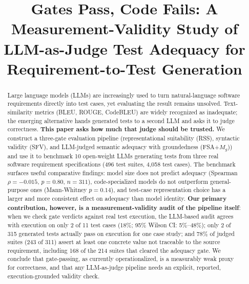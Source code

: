 \documentclass[conference]{IEEEtran}
\begin{document}
  \title{Gates Pass, Code Fails: A Measurement-Validity Study of LLM-as-Judge Test Adequacy for Requirement-to-Test Generation}

  \author{
  }

  \maketitle

  \begin{abstract}
  Large language models (LLMs) are increasingly used to turn natural-language software requirements directly into test cases, yet evaluating the result remains unsolved. Text-similarity metrics (BLEU, ROUGE, CodeBLEU) are widely recognized as inadequate; the emerging alternative hands generated tests to a second LLM and asks it to judge correctness. \textbf{This paper asks how much that judge should be trusted.} We construct a three-gate evaluation pipeline (representational suitability (RSS), syntactic validity (SFV), and LLM-judged semantic adequacy with groundedness (FSA+$M_g$)) and use it to benchmark 10 open-weight LLMs generating tests from three real software requirement specifications (496 test suites, 4{,}058 test cases). The benchmark surfaces useful comparative findings: model size does not predict adequacy (Spearman $\rho=-0.015$, $p=0.80$, $n=311$), code-specialized models do not outperform general-purpose ones (Mann-Whitney $p=0.14$), and test-case representation choice has a larger and more consistent effect on adequacy than model identity. \textbf{Our primary contribution, however, is a measurement-validity audit of the pipeline itself}: when we check gate verdicts against real test execution, the LLM-based audit agrees with execution on only 2 of 11 test cases (18\%; 95\% Wilson CI: 5\%--48\%); only 2 of 315 generated tests actually pass on execution for one case study; and 78\% of judged suites (243 of 311) assert at least one concrete value not traceable to the source requirement, including 168 of the 214 suites that cleared the adequacy gate. We conclude that gate-passing, as currently operationalized, is a measurably weak proxy for correctness, and that any LLM-as-judge pipeline needs an explicit, reported, execution-grounded validity check.
  \end{abstract}
\end{document}
